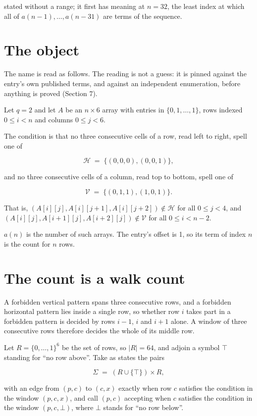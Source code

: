 \documentclass[11pt]{article}
\theoremstyle{definition}
\begin{document}
stated without a range; it first has meaning at $n = 32$, the least index at which all of $a(n-1),\dots,a(n-31)$ are terms of the sequence.

\section{The object}

The name is read as follows. The reading is not a guess: it is pinned against the entry's own published terms, and against an independent enumeration, before anything is proved (Section 7).

Let $q = 2$ and let $A$ be an $n \times 6$ array with entries in $\{0,1,\dots,1\}$, rows indexed $0 \le i < n$ and columns $0 \le j < 6$.

The condition is that no three consecutive cells of a row, read left to right, spell one of

\[\mathcal{H} \;=\; \{(0,0,0), (0,0,1)\},\]

and no three consecutive cells of a column, read top to bottom, spell one of

\[\mathcal{V} \;=\; \{(0,1,1), (1,0,1)\}.\]

That is, $(A[i][j],A[i][j{+}1],A[i][j{+}2]) \notin \mathcal{H}$ for all $0 \le j < 4$, and $(A[i][j],A[i{+}1][j],A[i{+}2][j]) \notin \mathcal{V}$ for all $0 \le i < n-2$.

$a(n)$ is the number of such arrays. The entry's offset is 1, so its term of index $n$ is the count for $n$ rows.

\section{The count is a walk count}

A forbidden vertical pattern spans three consecutive rows, and a forbidden horizontal pattern lies inside a single row, so whether row $i$ takes part in a forbidden pattern is decided by rows $i-1$, $i$ and $i+1$ alone. A window of three consecutive rows therefore decides the whole of its middle row.

Let $R = \{0,\dots,1\}^{6}$ be the set of rows, so $|R| = 64$, and adjoin a symbol $\top$ standing for ``no row above''. Take as states the pairs

\[\Sigma \;=\; (R \cup \{\top\}) \times R,\]

with an edge from $(p,c)$ to $(c,x)$ exactly when row $c$ satisfies the condition in the window $(p,c,x)$, and call $(p,c)$ accepting when $c$ satisfies the condition in the window $(p,c,\bot)$, where $\bot$ stands for ``no row below''.
\end{document}
